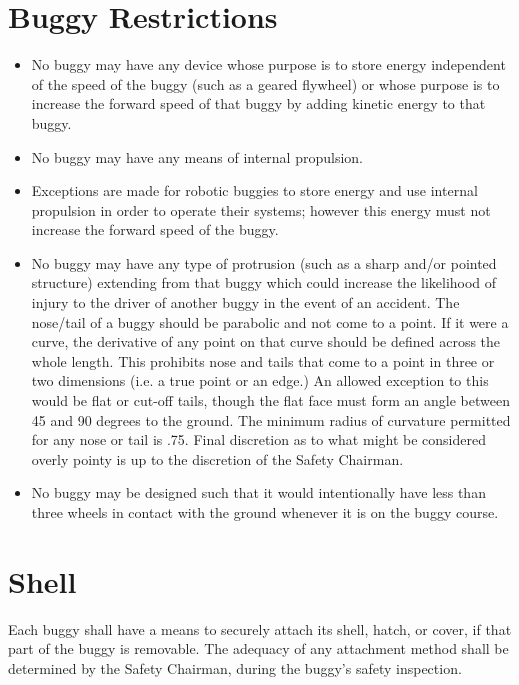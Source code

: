 \section{Buggy Restrictions}

	\begin{itemize}

		\item
		No buggy may have any device whose purpose is to store energy independent of the speed of the buggy (such as a geared flywheel) or whose purpose is to increase the forward speed of that buggy by adding kinetic energy to that buggy.

		\item
		No buggy may have any means of internal propulsion.

		\item
		Exceptions are made for robotic buggies to store energy and use internal propulsion in order to operate their systems; however this energy must not increase the forward speed of the buggy. 

		\item
		No buggy may have any type of protrusion (such as a sharp and/or pointed structure) extending from that buggy which could increase the likelihood of injury to the driver of another buggy in the event of an accident. The nose/tail of a buggy should be parabolic and not come to a point. If it were a curve, the derivative of any point on that curve should be defined across the whole length. This prohibits nose and tails that come to a point in three or two dimensions (i.e. a true point or an edge.) An allowed exception to this would be flat or cut-off tails, though the flat face must form an angle between 45 and 90 degrees to the ground. The minimum radius of curvature permitted for any nose or tail is .75. Final discretion as to what might be considered overly pointy is up to the discretion of the Safety Chairman.

		\item
		No buggy may be designed such that it would intentionally have less than three wheels in contact with the ground whenever it is on the buggy course.

	\end{itemize}

\section{Shell}

	Each buggy shall have a means to securely attach its shell, hatch, or cover, if that part of the buggy is removable. The adequacy of any attachment method shall be determined by the Safety Chairman, during the buggy's safety inspection.


